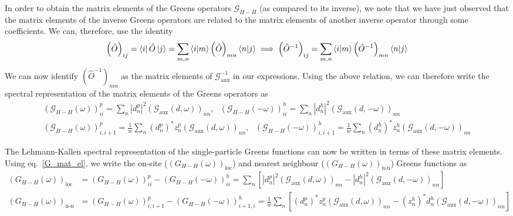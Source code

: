 \documentclass[10pt]{report}
\numberwithin{equation}{section}
\begin{document}
In order to obtain the matrix elements of the Greens operators \(\mathcal{G}_{H-H}\) (as compared to its inverse), we note that we have just observed that the matrix elements of the inverse Greens operators are related to the matrix elements of another inverse operator through some coefficients. We can, therefore, use the identity
\begin{equation}\begin{aligned}
\left(\hat O\right)_{ij} = \bra{i} \hat O \ket{j} = \sum_{m,n} \braket{i|m} \left(\hat O\right)_{mn} \braket{n|j} \implies \left(\hat O^{-1}\right)_{ij} = \sum_{m,n} \braket{i|m} \left(\hat O^{-1}\right)_{mn} \braket{n|j}
\end{aligned}\end{equation}
We can now identify \(\left(\hat O^{-1}\right)_{mn}\) as the matrix elements of \(\mathcal{G}_\text{aux}^{-1}\) in our expressions. Using the above relation, we can therefore write the spectral representation of the matrix elements of the Greens operators as 
\begin{gather}
	\left(\mathcal{G}_{H-H}(\omega)\right)^p_{ii} = \sum_{n} |d^p_n|^2 \left(\mathcal{G}_\text{aux}(d, \omega)\right)_{nn}, ~ ~ ~ \left(\mathcal{G}_{H-H}(-\omega)\right)^h_{ii} = \sum_{n} |d^h_n|^2 \left(\mathcal{G}_\text{aux}(d, -\omega)\right)_{nn}\\
	\left(\mathcal{G}_{H-H}\left(\omega\right) \right)^p_{i,i+1} = \frac{1}{w} \sum_n \left(d^p_n\right)^* z^p_n \left(\mathcal{G}_\text{aux}(d, \omega) \right)_{nn}, ~ ~ ~ \left(\mathcal{G}_{H-H}\left(-\omega\right) \right)^h_{i,i+1} = \frac{1}{w} \sum_n \left(d^h_n\right)^* z^h_n \left(\mathcal{G}_\text{aux}(d, -\omega) \right)_{nn}
\end{gather}

The Lehmann-Kallen spectral representation of the single-particle Greens functions can now be written in terms of these matrix elements. Using eq.~\ref{G_mat_el}, we write the on-site ($\left(G_{H-H}(\omega)\right)_\text{loc}$) and nearest neighbour ($\left(G_{H-H}(\omega)\right)_\text{n-n}$) Greens functions as
\begin{equation}\begin{aligned}
	\label{greens_func_siam}
	\left(G_{H-H}(\omega)\right)_\text{loc} &= \left(G_{H-H}(\omega)\right)_{ii}^p - \left(G_{H-H}(-\omega)\right)_{ii}^h = \sum_n \left[|d^p_n|^2 \left(\mathcal{G}_\text{aux}(d, \omega)\right)_{nn} - |d^h_n|^2 \left(\mathcal{G}_\text{aux}(d, -\omega)\right)_{nn}\right] \\
	\left(G_{H-H}(\omega)\right)_\text{n-n} &= \left(G_{H-H}(\omega)\right)_{i,i+1}^p - \left(G_{H-H}(-\omega)\right)_{i+1,i}^h = \frac{1}{w}\sum_n \left[\left(d^p_n\right)^* z^p_n \left(\mathcal{G}_\text{aux}(d, \omega) \right)_{nn} - \left(z^h_n\right)^* d^h_n \left(\mathcal{G}_\text{aux}(d, -\omega)\right)_{nn}\right] 
\end{aligned}\end{equation}
\end{document}
